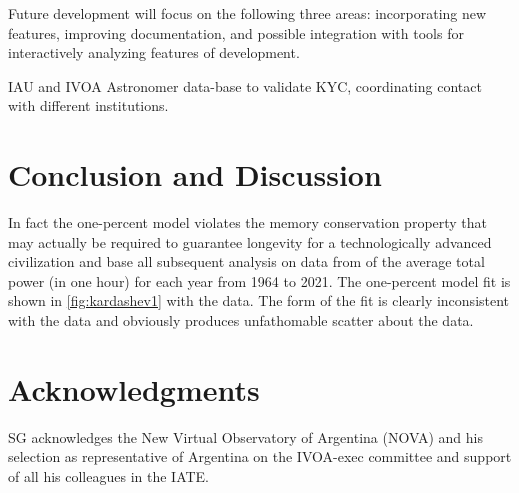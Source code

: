 \documentclass[final,5p,times,twocolumn,authoryear]{elsarticle}
\begin{document}
Future development will focus on the following three areas: incorporating
new features, improving documentation, and 
possible integration with tools for interactively analyzing features of development.

IAU and IVOA Astronomer data-base to validate KYC, coordinating contact with different institutions. 

\section{Conclusion and Discussion}
\label{sec:conc}
In fact the one-percent model violates the memory conservation property that may actually be required to guarantee longevity for a technologically advanced civilization and base all subsequent analysis on data from \cite{owidenergy} of the average total power (in one hour) for each year from 1964 to 2021. The one-percent model fit is shown in \ref{fig:kardashev1} with the data. The form of the fit is clearly inconsistent with the data and obviously produces unfathomable scatter about the data.
\section{Acknowledgments}
SG acknowledges the New Virtual Observatory of Argentina (NOVA) and his selection as representative of Argentina on the IVOA-exec committee and support of all his colleagues in the IATE.

%


\end{document}
